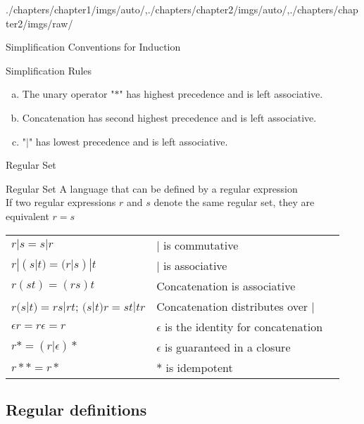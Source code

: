 \begin{graphicspathcontext}{{./chapters/chapter1/imgs/auto/},{./chapters/chapter2/imgs/auto/},{./chapters/chapter2/imgs/raw/}}
\begin{bibunit}[apalike]
\begin{frame}{Simplification Conventions for Induction}
	\vspace{1cm}
	\begin{block}{Simplification Rules}
		\begin{enumerate}[a)]
			\item The unary operator "$*$" has highest precedence and is left associative.
			\item Concatenation has second highest precedence and is left associative.
			\item "$|$" has lowest precedence and is left associative.
		\end{enumerate}
	\end{block}
\end{frame}

\begin{frame}{Regular Set}
	\begin{definitionblock}{Regular Set}
		A language that can be defined by a regular expression \\
		\smaller If two regular expressions $r$ and $s$ denote the same regular set, they are equivalent $r = s$
	\end{definitionblock}
	\vspace{.5cm}
	\begin{tabularx}{\linewidth}{|X|X|X|}
		\hline
		\tabularheading\chead{Law}&\chead{Description} \\
		\hline
		$r|s = s|r$ & $|$ is commutative \\
		\hline
		$r|(s|t) = (r|s)|t$ & $|$ is associative \\
		\hline
		$r(st) = (rs)t$ & Concatenation is associative \\
		\hline
		$r(s|t) = rs|rt$; $(s|t)r = st|tr$ & Concatenation distributes over $|$ \\
		\hline
		$\epsilon r = r\epsilon = r$ & $\epsilon$ is the identity for concatenation \\
		\hline
		$r* = (r|\epsilon)*$ & $\epsilon$ is guaranteed in a closure \\
		\hline
		$r** = r*$ & $*$ is idempotent \\
		\hline
	\end{tabularx}
\end{frame}

\subsection{Regular definitions}
\subsectiontableofcontentslide


\end{bibunit}
\end{graphicspathcontext}
